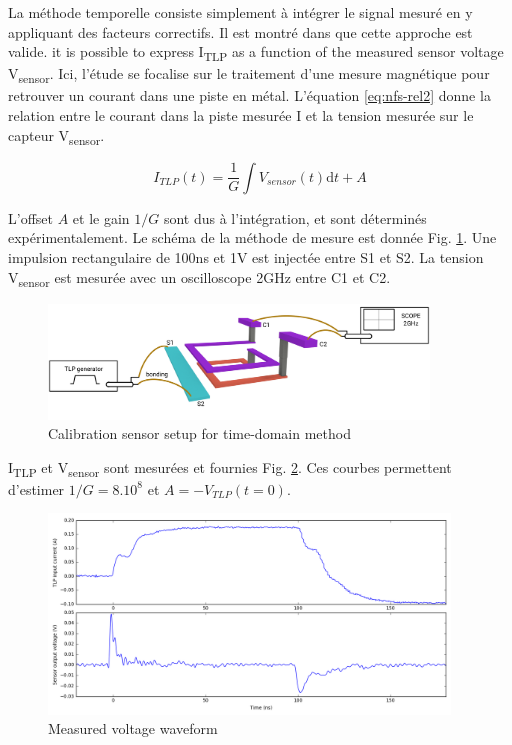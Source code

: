 La méthode temporelle consiste simplement à intégrer le signal mesuré en y appliquant des facteurs correctifs.
Il est montré dans \cite{near-field-scan} que cette approche est valide.
it is possible to express I\textsubscript{TLP} as a function of the measured sensor voltage V\textsubscript{sensor}.
Ici, l'étude se focalise sur le traitement d'une mesure magnétique pour retrouver un courant dans une piste en métal.
L'équation \ref{eq:nfs-rel2} donne la relation entre le courant dans la piste mesurée I et la tension mesurée sur le capteur V\textsubscript{sensor}.

\begin{equation}
I_{TLP}(t) = \frac{1}{G}\int V_{sensor}(t) \mathrm{d}t + A
\label{eq:nfs-rel2}
\end{equation}

L'offset $A$ et le gain $1/G$ sont dus à l'intégration, et sont déterminés expérimentalement.
Le schéma de la méthode de mesure est donnée Fig. \ref{fig:calibration-sensor}.
Une impulsion rectangulaire de 100ns et 1V est injectée entre S1 et S2.
La tension V\textsubscript{sensor} est mesurée avec un oscilloscope 2GHz entre C1 et C2.

\begin{figure}[!h]
  \centering
  \includegraphics[width=0.9\textwidth]{src/1/figures/sensor_measurement_setup.pdf}
  \caption{Calibration sensor setup for time-domain method}
  \label{fig:calibration-sensor}
\end{figure}

I\textsubscript{TLP} et V\textsubscript{sensor} sont mesurées et fournies Fig. \ref{fig:measurement-nfs}.
Ces courbes permettent d'estimer $1/G = 8.10^8$ et $A = -V_{TLP}(t = 0)$.

\begin{figure}[!h]
  \centering
  \includegraphics[width=0.95\textwidth]{src/1/figures/measured_waveform.png}
  \caption{Measured voltage waveform}
  \label{fig:measurement-nfs}
\end{figure}

